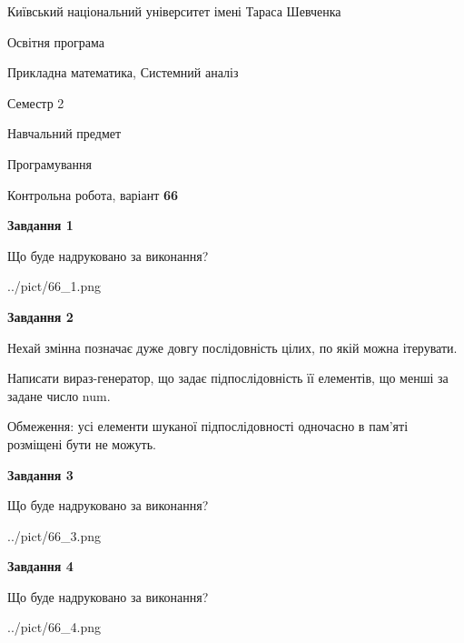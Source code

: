 \documentclass[12pt, ukrainian]{article}
\begin{document}
{{\begin {small}\par
{ \center  Київський національний університет імені Тараса Шевченка \par}
{\parbox {5 cm}{Освітня програма \hfill}{\parbox {8 cm}{Прикладна математика, Системний аналіз \hfill}}\parbox {5 cm}{\hfill Семестр 2}}\par
{\parbox {5 cm} {Навчальний предмет \hfill}\parbox {7 cm}{Програмування \hfill}\parbox {6cm}{\hfill}\par}\vspace{-7pt} \end{small}}{\center Контрольна робота, варіант  \No \textbf
{ 66 }\par}}
{
\begin {large}
{\begin {center}\textbf{Завдання 1}\end {center}}\par
Що буде надруковано за виконання?\par\par
\begin{center}
	{../pict/66_1.png}
\end{center}
\newpage

{\begin {center}\textbf{Завдання 2}\end {center}}\par
Нехай змінна  позначає дуже довгу послідовність цілих, по якій можна ітерувати.

Написати вираз-генератор, що задає підпослідовність її елементів, що менші за задане число num.

Обмеження: усі елементи шуканої підпослідовності одночасно в пам'яті розміщені бути не можуть.\par
\newpage

{\begin {center}\textbf{Завдання 3}\end {center}}\par
Що буде надруковано за виконання?\par
\begin{center}
	{../pict/66_3.png}
\end{center}
\newpage

{\begin {center}\textbf{Завдання 4}\end {center}}\par
Що буде надруковано за виконання?\par
\begin{center}
	{../pict/66_4.png}
\end{center}
\newpage


\end{large}}
\end{document}
